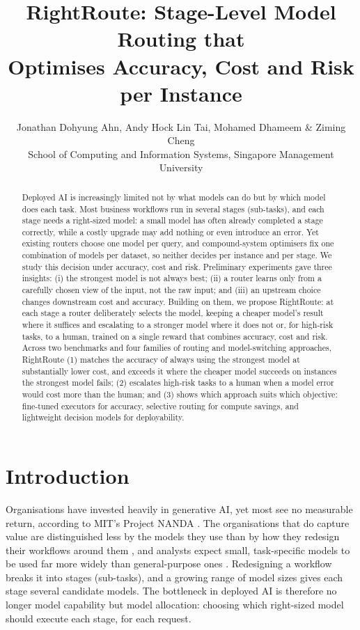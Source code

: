 \documentclass{article}
\title{RightRoute: Stage-Level Model Routing that\\Optimises Accuracy, Cost and Risk\\per Instance}
\author{Jonathan Dohyung Ahn, Andy Hock Lin Tai, Mohamed Dhameem \& Ziming Cheng\\
School of Computing and Information Systems, Singapore Management University
}
\begin{document}
\maketitle

\begin{abstract}
Deployed AI is increasingly limited not by what models can do but by which model does each task. Most business workflows run in several stages (sub-tasks), and each stage needs a right-sized model: a small model has often already completed a stage correctly, while a costly upgrade may add nothing or even introduce an error. Yet existing routers choose one model per query, and compound-system optimisers fix one combination of models per dataset, so neither decides per instance and per stage. We study this decision under accuracy, cost and risk. Preliminary experiments gave three insights: (i) the strongest model is not always best; (ii) a router learns only from a carefully chosen view of the input, not the raw input; and (iii) an upstream choice changes downstream cost and accuracy. Building on them, we propose RightRoute: at each stage a router deliberately selects the model, keeping a cheaper model's result where it suffices and escalating to a stronger model where it does not or, for high-risk tasks, to a human, trained on a single reward that combines accuracy, cost and risk. Across two benchmarks and four families of routing and model-switching approaches, RightRoute (1) matches the accuracy of always using the strongest model at substantially lower cost, and exceeds it where the cheaper model succeeds on instances the strongest model fails; (2) escalates high-risk tasks to a human when a model error would cost more than the human; and (3) shows which approach suits which objective: fine-tuned executors for accuracy, selective routing for compute savings, and lightweight decision models for deployability.
\end{abstract}

\section{Introduction}

Organisations have invested heavily in generative AI, yet most see no measurable return, according to MIT's Project NANDA \citep{nanda2025genai}. The organisations that do capture value are distinguished less by the models they use than by how they redesign their workflows around them \citep{mckinsey2025state}, and analysts expect small, task-specific models to be used far more widely than general-purpose ones \citep{gartner2025small}. Redesigning a workflow breaks it into stages (sub-tasks), and a growing range of model sizes gives each stage several candidate models. The bottleneck in deployed AI is therefore no longer model capability but model allocation: choosing which right-sized model should execute each stage, for each request.
\end{document}
